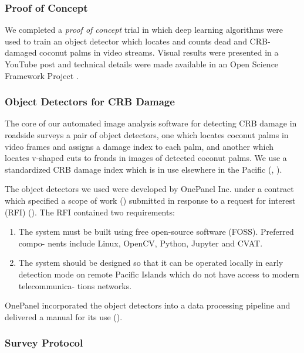 \documentclass[12pt,
letterpaper,english,bibliography=totocnumbered, abstract=on]{scrartcl}
\begin{document}
\subsubsection{Proof of Concept}

We completed a \textit{proof of concept} trial in which deep learning algorithms were used to train an object detector which locates and counts dead and CRB-damaged coconut palms in video streams.  Visual results were presented in a YouTube post \parencite{moore_training_2019} and technical details were made available in an Open Science Framework Project \parencite{moore_open_2019}.

\subsubsection{Object Detectors for CRB Damage}

The core of our automated image analysis software for detecting CRB damage in roadside surveys a pair of object detectors, one which locates coconut palms in video frames and assigns a damage index to each palm, and another which locates v-shaped cuts to fronds in images of detected coconut palms. We use a standardized CRB damage index which is in use elsewhere in the Pacific (\cite{jackson_rhinoceros_2019-1}, \cite{vaqalo_coconut_2017}).

The object detectors we used were developed by OnePanel Inc. under a contract which specified a scope of work (\cite{onepanelinc.ScopeWorkObject2020}) submitted in response to a request for interest (RFI) (\cite{mooreRequestInterestObject2020}). The RFI contained two requirements:
\begin{enumerate}
	\item The system must be built using free open-source software (FOSS). Preferred compo-
	nents include Linux, OpenCV, Python, Jupyter and CVAT.
	\item The system should be designed so that it can be operated locally in early detection
	mode on remote Pacific Islands which do not have access to modern telecommunica-
	tions networks.
\end{enumerate}
OnePanel incorporated the object detectors into a data processing pipeline and delivered a manual for its use (\cite{onepanelinc.AIPipelineOperations2020}).

\subsubsection{Survey Protocol}
\end{document}
